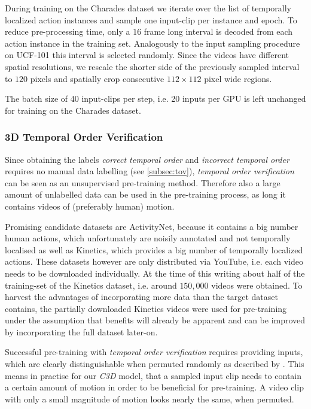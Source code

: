 During training on the Charades dataset we iterate over the list of temporally localized action instances and sample one input-clip per instance and epoch.
To reduce pre-processing time, only a $16$ frame long interval is decoded from each action instance in the training set.
Analogously to the input sampling procedure on UCF-101 this interval is selected randomly.
Since the videos have different spatial resolutions, we rescale the shorter side of the previously sampled interval to $120$ pixels and 
spatially crop consecutive $112 \times 112$ pixel wide regions.

The batch size of 40 input-clips per step, i.e. 20 inputs per GPU is left unchanged for training on the Charades dataset.

\subsubsection{3D Temporal Order Verification}
\label{subsubsec:tovmethods}
Since obtaining the labels \textit{correct temporal order} and \textit{incorrect temporal order} requires no manual data labelling (see \ref{subsec:tov}), \textit{temporal order verification} can be seen as an unsupervised pre-training method.
Therefore also a large amount of unlabelled data can be used in the pre-training process, as long it contains videos of (preferably human) motion.

Promising candidate datasets are ActivityNet, because it contains a big number human actions, which unfortunately are noisily annotated and not temporally localised as well as Kinetics, which provides a big number of temporally localized actions.
These datasets however are only distributed via YouTube, i.e. each video needs to be downloaded individually.
At the time of this writing about half of the training-set of the Kinetics dataset, i.e. around $150,000$ videos were obtained.
To harvest the advantages of incorporating more data than the target dataset contains, the partially downloaded Kinetics videos were used for pre-training under the assumption that benefits will already be apparent and can be improved by incorporating the full dataset later-on.

Successful pre-training with \textit{temporal order verification} requires providing inputs, which are clearly distinguishable when permuted randomly as described by \textcite{misra_shuffle_2016}.
This means in practise for our \textit{C3D} model, that a sampled input clip needs to contain a certain amount of motion in order to be beneficial for pre-training.
A video clip with only a small magnitude of motion looks nearly the same, when permuted.

